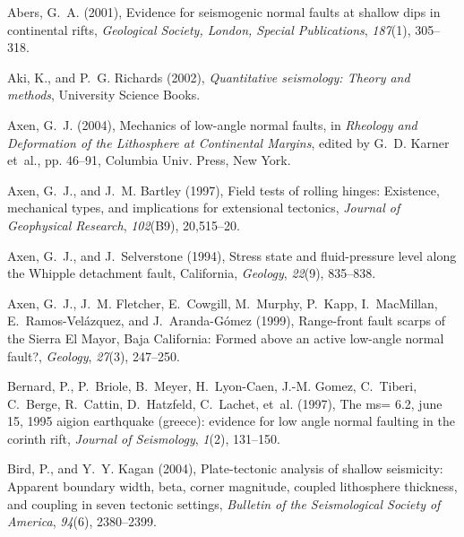 \documentclass[draft,grl]{AGUTeX}
\begin{document}
\begin{article}
\begin{thebibliography}{46}
Abers, G.~A. (2001), Evidence for seismogenic normal faults at shallow dips in
  continental rifts, \textit{Geological Society, London, Special Publications},
  \textit{187}(1), 305--318.

Aki, K., and P.~G. Richards (2002), \textit{Quantitative seismology: Theory and
  methods}, University Science Books.

Axen, G.~J. (2004), Mechanics of low-angle normal faults, in \textit{Rheology
  and Deformation of the Lithosphere at Continental Margins}, edited by G.~D.
  Karner et~al., pp. 46--91, Columbia Univ. Press, New York.

Axen, G.~J., and J.~M. Bartley (1997), Field tests of rolling hinges:
  Existence, mechanical types, and implications for extensional tectonics,
  \textit{Journal of Geophysical Research}, \textit{102}(B9), 20,515--20.

Axen, G.~J., and J.~Selverstone (1994), Stress state and fluid-pressure level
  along the {W}hipple detachment fault, {C}alifornia, \textit{Geology},
  \textit{22}(9), 835--838.

Axen, G.~J., J.~M. Fletcher, E.~Cowgill, M.~Murphy, P.~Kapp, I.~MacMillan,
  E.~Ramos-Vel{\'a}zquez, and J.~Aranda-G{\'o}mez (1999), Range-front fault
  scarps of the {Sierra El Mayor}, {Baja California}: {F}ormed above an active
  low-angle normal fault?, \textit{Geology}, \textit{27}(3), 247--250.

Bernard, P., P.~Briole, B.~Meyer, H.~Lyon-Caen, J.-M. Gomez, C.~Tiberi,
  C.~Berge, R.~Cattin, D.~Hatzfeld, C.~Lachet, et~al. (1997), The ms= 6.2, june
  15, 1995 aigion earthquake (greece): evidence for low angle normal faulting
  in the corinth rift, \textit{Journal of Seismology}, \textit{1}(2), 131--150.

Bird, P., and Y.~Y. Kagan (2004), Plate-tectonic analysis of shallow
  seismicity: Apparent boundary width, beta, corner magnitude, coupled
  lithosphere thickness, and coupling in seven tectonic settings,
  \textit{Bulletin of the Seismological Society of America}, \textit{94}(6),
  2380--2399.


\end{thebibliography}
\end{article}
\end{document}
